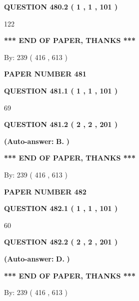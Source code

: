 \documentclass[12pt]{article}
\begin{document}
  
{\textbf{\large{QUESTION
480.2 
 ( 1 , 1 , 101 )
}}}

122
   
   
   
   
\vspace{1.0in} 
{\textbf{\large{ *** END OF PAPER, THANKS *** }}} 
   
   
\hspace{1.0in} By: 
 239 ( 416 ,  613 )
   
   
   
   
\newpage 
\setcounter{page}{ 
   481001 } 
   
   
 {\textbf{ \Large{ PAPER NUMBER  481  }}}
   
   
   
   
  
  
{\textbf{\large{QUESTION
481.1 
 ( 1 , 1 , 101 )
}}}

69
  
  
{\textbf{\large{QUESTION
481.2 
 ( 2 , 2 , 201 )
}}}
 
 
{\textbf{(Auto-answer:}}
{\textbf{\large{
B.}}}
{\textbf{)}}
 
 
   
   
   
   
\vspace{1.0in} 
{\textbf{\large{ *** END OF PAPER, THANKS *** }}} 
   
   
\hspace{1.0in} By: 
 239 ( 416 ,  613 )
   
   
   
   
\newpage 
\setcounter{page}{ 
   482001 } 
   
   
 {\textbf{ \Large{ PAPER NUMBER  482  }}}
   
   
   
   
  
  
{\textbf{\large{QUESTION
482.1 
 ( 1 , 1 , 101 )
}}}

60
  
  
{\textbf{\large{QUESTION
482.2 
 ( 2 , 2 , 201 )
}}}
 
 
{\textbf{(Auto-answer:}}
{\textbf{\large{
D.}}}
{\textbf{)}}
 
 
   
   
   
   
\vspace{1.0in} 
{\textbf{\large{ *** END OF PAPER, THANKS *** }}} 
   
   
\hspace{1.0in} By: 
 239 ( 416 ,  613 )
   
   
   
\end{document}

